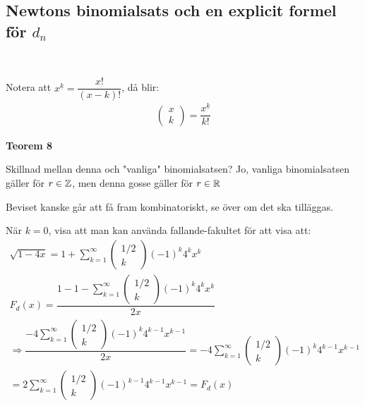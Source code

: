 \subsection{Newtons binomialsats och en explicit formel för $d_n$}\hfill\\
\par\bigskip
\noindent Notera att $x^{\underline{k}} = \dfrac{x!}{(x-k)!}$, då blir:
\begin{equation*}
  \begin{gathered}
    \begin{pmatrix}x\\k\end{pmatrix} = \dfrac{x^{\underline{k}}}{k!} 
  \end{gathered}
\end{equation*}
\par\bigskip
\noindent\textbf{Teorem 8}\par
\noindent Skillnad mellan denna och "vanliga" binomialsatsen? Jo, vanliga binomialsatsen gäller för $r\in\mathbb{Z}$, men denna gosse gäller för $r\in\mathbb{R}$\par
\noindent Beviset kanske går att få fram kombinatoriskt, se över om det ska tilläggas.
\par\bigskip
\begin{prf}{}
  När $k=0$, visa att man kan använda fallande-fakultet för att visa att:
  \begin{equation*}
    \begin{gathered}
      \sqrt{1-4x} = 1+\sum_{k=1}^{\infty}\begin{pmatrix}1/2\\k\end{pmatrix}(-1)^k4^kx^k\\
      F_d(x) = \dfrac{1-1-\sum_{k=1}^{\infty}\begin{pmatrix}1/2\\k\end{pmatrix}(-1)^k4^kx^k}{2x}\\
      \Rightarrow \dfrac{-4\sum_{k=1}^{\infty}\begin{pmatrix}1/2\\k\end{pmatrix}(-1)^k4^{k-1}x^{k-1}}{2x} = -4\sum_{k=1}^{\infty}\begin{pmatrix}1/2\\k\end{pmatrix}(-1)^k4^{k-1}x^{k-1}\\
      = 2\sum_{k=1}^{\infty}\begin{pmatrix}1/2\\k\end{pmatrix}(-1)^{k-1}4^{k-1}x^{k-1} = F_d(x)
    \end{gathered}
  \end{equation*}
\end{prf}
